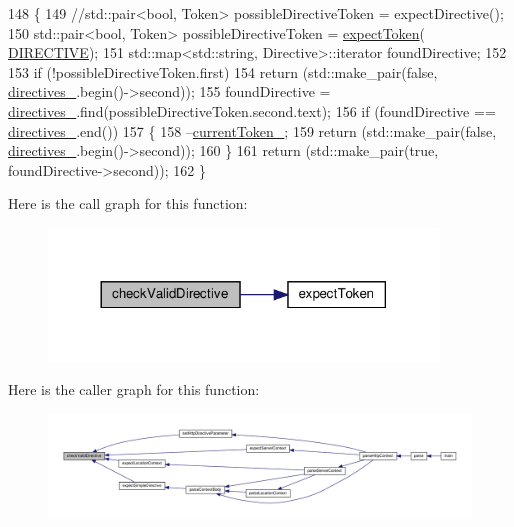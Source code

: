 \begin{DoxyCode}
148     \{
149         \textcolor{comment}{//std::pair<bool, Token> possibleDirectiveToken = expectDirective();}
150         std::pair<bool, Token> possibleDirectiveToken = \hyperlink{classft_1_1_parser_a1615a752d3642bb53598e2c8db810db0}{expectToken}(
      \hyperlink{namespaceft_aa520fbf142ba1e7e659590c07da31921ae3852cb010d5e422026faf83b3c16f0e}{DIRECTIVE});
151         std::map<std::string, Directive>::iterator foundDirective;
152 
153         \textcolor{keywordflow}{if} (!possibleDirectiveToken.first)
154             \textcolor{keywordflow}{return} (std::make\_pair(\textcolor{keyword}{false}, \hyperlink{classft_1_1_parser_abe21d1e60d970dd268181e79250b5399}{directives\_}.begin()->second)); 
155         foundDirective = \hyperlink{classft_1_1_parser_abe21d1e60d970dd268181e79250b5399}{directives\_}.find(possibleDirectiveToken.second.text);
156         \textcolor{keywordflow}{if} (foundDirective == \hyperlink{classft_1_1_parser_abe21d1e60d970dd268181e79250b5399}{directives\_}.end())
157         \{
158             --\hyperlink{classft_1_1_parser_a942c5b794d108f144c5b5028aaa34cb6}{currentToken\_};
159             \textcolor{keywordflow}{return} (std::make\_pair(\textcolor{keyword}{false}, \hyperlink{classft_1_1_parser_abe21d1e60d970dd268181e79250b5399}{directives\_}.begin()->second)); 
160         \}
161         \textcolor{keywordflow}{return} (std::make\_pair(\textcolor{keyword}{true}, foundDirective->second)); 
162     \}
\end{DoxyCode}
Here is the call graph for this function\+:
\nopagebreak
\begin{figure}[H]
\begin{center}
\leavevmode
\includegraphics[width=293pt]{classft_1_1_parser_ad48298d21629daf7c9a31e101bf322ba_cgraph}
\end{center}
\end{figure}
Here is the caller graph for this function\+:
\nopagebreak
\begin{figure}[H]
\begin{center}
\leavevmode
\includegraphics[width=350pt]{classft_1_1_parser_ad48298d21629daf7c9a31e101bf322ba_icgraph}
\end{center}
\end{figure}
\mbox{\label{classft_1_1_parser_a31501116433b0b1f8d9d58f27658ea98}} 
